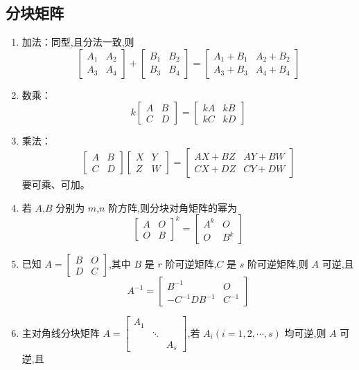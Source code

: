 \documentclass[UTF8]{ctexart}
\theoremstyle{remark}
\begin{document}
	\subsection{分块矩阵}
	\begin{enumerate}
		\item 加法：同型,且分法一致,则
		\[
		\begin{bmatrix}
			A_1 & A_2 \\
			A_3 & A_4
		\end{bmatrix}
		+
		\begin{bmatrix}
			B_1 & B_2 \\
			B_3 & B_4
		\end{bmatrix}
		=
		\begin{bmatrix}
			A_1 + B_1 & A_2 + B_2 \\
			A_3 + B_3 & A_4 + B_4
		\end{bmatrix}
		\]
		\item 数乘：
		\[
		k
		\begin{bmatrix}
			A & B \\
			C & D
		\end{bmatrix}
		=
		\begin{bmatrix}
			kA & kB \\
			kC & kD
		\end{bmatrix}
		\]
		\item 乘法：
		\[
		\begin{bmatrix}
			A & B \\
			C & D
		\end{bmatrix}
		\begin{bmatrix}
			X & Y \\
			Z & W
		\end{bmatrix}
		=
		\begin{bmatrix}
			AX + BZ & AY + BW \\
			CX + DZ & CY + DW
		\end{bmatrix}
		\]
		要可乘、可加。
		\item 若 \(A\),\(B\) 分别为 \(m\),\(n\) 阶方阵,则分块对角矩阵的幂为
		\[
		\begin{bmatrix}
			A & O \\
			O & B
		\end{bmatrix}^k
		=
		\begin{bmatrix}
			A^k & O \\
			O & B^k
		\end{bmatrix}
		\]
		\item 已知 \(A = 
		\begin{bmatrix}
			B & O \\
			D & C
		\end{bmatrix}\),其中 \(B\) 是 \(r\) 阶可逆矩阵,\(C\) 是 \(s\) 阶可逆矩阵,则 \(A\) 可逆,且
		\[
		A^{-1} = 
		\begin{bmatrix}
			B^{-1} & O \\
			-C^{-1}DB^{-1} & C^{-1}
		\end{bmatrix}
		\]
		\item 主对角线分块矩阵 \(A = 
		\begin{bmatrix}
			A_1 & & \\
			& \ddots & \\
			& & A_s
		\end{bmatrix}\),若 \(A_i (i = 1,2,\cdots,s)\) 均可逆,则 \(A\) 可逆,且
	\end{enumerate}
\end{document}
